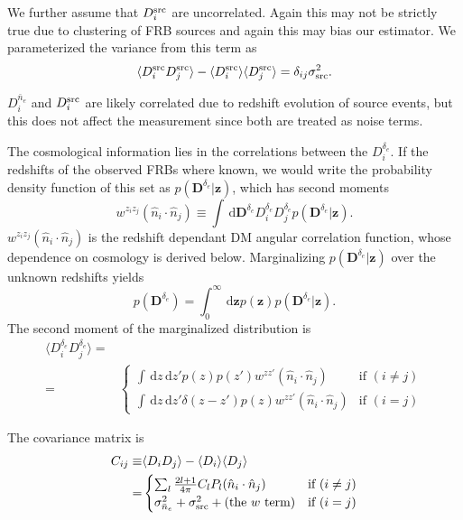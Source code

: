 \documentclass[onecolumn,prd,noshowpacs,nofootinbib,amsmath,amssymb]{revtex4}
\newcommand{\ud}{\,\mathrm{d}}
\newcommand{\red}{}
\begin{document}
We further assume that $D^{\rm src}_i$ are uncorrelated. Again this may not
be strictly true due to clustering of FRB sources and again this may bias our
estimator. We parameterized the variance from this term as 
\begin{equation}
    \label{e:sig_src}
    \langle D^{\rm src}_i D^{\rm src}_j \rangle
    - \langle D^{\rm src}_i \rangle \langle D^{\rm src}_j \rangle
    = \delta_{ij} \sigma^2_{\rm src}.
\end{equation}

\red{$D^{\bar{n}_e}_i$ and $D^{\rm src}_i$ are likely correlated due to
    redshift evolution of source events, but this does not affect the
    measurement since both are treated as noise terms.}

The cosmological information lies in the correlations between the
$D^{\delta_e}_i$. If the redshifts of the observed FRBs where known, we
would write the probability density function of this set as
$p(\boldsymbol D^{\delta_e} | \boldsymbol z)$, which has second moments
\begin{equation}
    w^{z_i z_j}(\hat{n}_i\cdot\hat{n}_j) \equiv \int \ud \boldsymbol D^{\delta_e}
        D^{\delta_e}_i D^{\delta_e}_j p(\boldsymbol D^{\delta_e} | \boldsymbol z).
\end{equation}
$w^{z_i z_j}(\hat{n}_i\cdot\hat{n}_j)$ is the redshift dependant DM angular
correlation function, whose dependence on cosmology is derived below.
Marginalizing $p(\boldsymbol D^{\delta_e} | \boldsymbol z)$ over the unknown redshifts
yields
\begin{equation}
    p(\boldsymbol D^{\delta_e}) = \int_0^\infty \ud \boldsymbol z
        p(\boldsymbol z) p(\boldsymbol D^{\delta_e} | \boldsymbol z).
\end{equation}
The second moment of the marginalized distribution is
\begin{align}
    \langle D^{\delta_e}_i D^{\delta_e}_j \rangle =& \\
        =&
        \begin{cases}
            \int \ud z \ud z' p(z) p(z') w^{z z'}(\hat{n}_i\cdot\hat{n}_j) 
                &  \text{if } (i \neq j) \\
            \int \ud z \ud z' \delta(z - z') p(z) w^{z z'}(\hat{n}_i\cdot\hat{n}_j)
                &  \text{if } (i = j)
        \end{cases}
\end{align}

The covariance matrix is
\begin{align}
    C_{ij} \equiv& \langle D_i D_j \rangle - \langle D_i \rangle \langle D_j
    \rangle\\
    =&
        \begin{cases}
            \sum_l \frac{2l+1}{4 \pi} C_l P_l(\hat{n}_i\cdot\hat{n}_j)
                &  \text{if } (i \neq j) \\
            \sigma_{\bar{n}_e}^2 + \sigma^2_{\rm src}
                + \textrm{(the $w$ term)}
                &  \text{if } (i = j)
        \end{cases}
\end{align}
\end{document}
